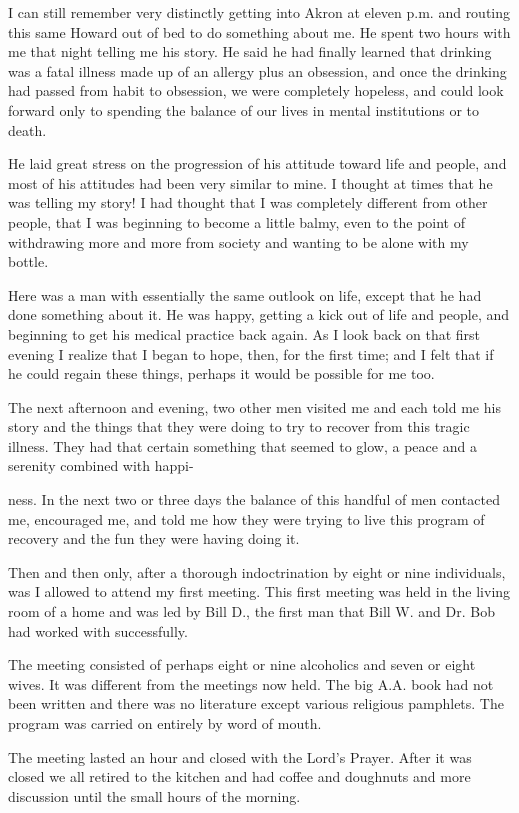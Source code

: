 I can still remember very distinctly getting into Akron at eleven p.m. and routing this same Howard out of bed to do something about me. He spent two hours with me that night telling me his story. He said he had finally learned that drinking was a fatal illness made up of an allergy plus an obsession, and once the drinking had passed from habit to obsession, we were completely hopeless, and could look forward only to spending the balance of our lives in mental institutions or to death.

He laid great stress on the progression of his attitude toward life and people, and most of his attitudes had been very similar to mine. I thought at times that he was telling my story! I had thought that I was completely different from other people, that I was beginning to become a little balmy, even to the point of withdrawing more and more from society and wanting to be alone with my bottle.

Here was a man with essentially the same outlook on life, except that he had done something about it. He was happy, getting a kick out of life and people, and beginning to get his medical practice back again. As I look back on that first evening I realize that I began to hope, then, for the first time; and I felt that if he could regain these things, perhaps it would be possible for me too.

The next afternoon and evening, two other men visited me and each told me his story and the things that they were doing to try to recover from this tragic illness. They had that certain something that seemed to glow, a peace and a serenity combined with happi-

ness. In the next two or three days the balance of this handful of men contacted me, encouraged me, and told me how they were trying to live this program of recovery and the fun they were having doing it.

Then and then only, after a thorough indoctrination by eight or nine individuals, was I allowed to attend my first meeting. This first meeting was held in the living room of a home and was led by Bill D., the first man that Bill W. and Dr. Bob had worked with successfully.

The meeting consisted of perhaps eight or nine alcoholics and seven or eight wives. It was different from the meetings now held. The big A.A. book had not been written and there was no literature except various religious pamphlets. The program was carried on entirely by word of mouth.

The meeting lasted an hour and closed with the Lord’s Prayer. After it was closed we all retired to the kitchen and had coffee and doughnuts and more discussion until the small hours of the morning.

